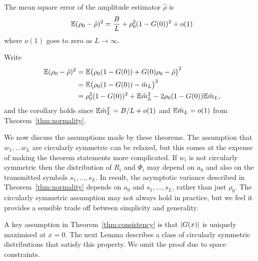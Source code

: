 \documentclass[conference]{IEEEtran}
\begin{document}
\begin{corollary}\label{cor:ampmse}
The mean square error of the amplitude estimator $\hat{\rho}$ is 
\[
{\mathbb E} (\rho_0 - \hat{\rho})^2 = \frac{B}{L} + \rho_0^2(1 - G(0))^2 + o(1)
\] 
where $o(1)$ goes to zero as $L \rightarrow \infty$.
\end{corollary}
\begin{IEEEproof} Write
\begin{align*}
{\mathbb E} (\rho_0 - \hat{\rho})^2 &= {\mathbb E} \big( \rho_0(1 - G(0)) + G(0)\rho_0 - \hat{\rho} \big)^2 \\
&= {\mathbb E} \big( \rho_0(1 - G(0)) - \hat{m}_L \big)^2 \\
&= \rho_0^2(1 - G(0))^2 + {\mathbb E} \hat{m}_L^2 - 2\rho_0(1 - G(0)){\mathbb E}\hat{m}_L,
\end{align*} 
and the corollary holds since ${\mathbb E} \hat{m}_L^2 = B/L + o(1)$ and ${\mathbb E}\hat{m}_L = o(1)$ from Theorem~\ref{thm:normality}.
\end{IEEEproof}



We now discuss the assumptions made by these theorems.  The assumption that $w_1, \dots w_L$ are circularly symmetric can be relaxed, but this comes at the expense of making the theorem statements more complicated.  If $w_i$ is not circularly symmetric then the distribution of $R_i$ and $\Phi_i$ may depend on $a_0$ and also on the transmitted symbols $s_1, \dots, s_L$.  In result, the asymptotic variance described in Theorem~\ref{thm:normality} depends on $a_0$ and $s_1, \dots, s_L$, rather than just $\rho_0$.  The circularly symmetric assumption may not always hold in practice, but we feel it provides a sensible trade off between simplicity and generality.

A key assumption in Theorem~\ref{thm:consistency} is that ${\left\vert G(x) \right\vert}$ is uniquely maximised at $x = 0$.  The next Lemma describes a class of circularly symmetric distributions that satisfy this property.  We omit the proof due to space constraints.
\end{document}
